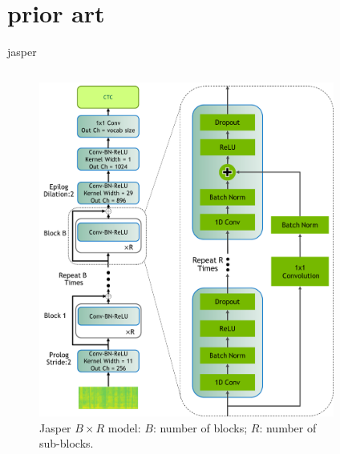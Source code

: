 \documentclass[aspectratio=169,xcolor={dvipsnames,svgnames}]{beamer}
\begin{document}
\section{prior art}
\label{sec:prior-art}
\begin{frame}[label={sec:jasper-prior-art}]{jasper}
\begin{columns}
\begin{column}{0.4\columnwidth}
\begin{figure}[htbp]
\centering
\includegraphics[width=.9\linewidth]{org-download-images/Contribution/2024-08-28_07-44-17_screenshot.png}
\caption{Jasper \(B\times R\) model: \(B\): number of blocks; \(R\): number of sub-blocks.}
\end{figure}
\end{column}
\begin{column}{0.45\columnwidth}
\begin{figure}[htbp]
\centering

\end{figure}
\end{column}
\end{columns}
\end{frame}
\end{document}
